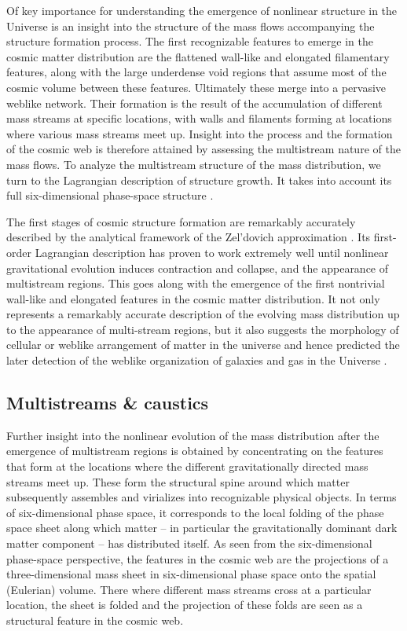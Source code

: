 \documentclass[a4paper, 11pt]{article}
\begin{document}
Of key importance for understanding the emergence of nonlinear structure in the Universe is an insight into the structure of the mass flows accompanying the structure formation process. The first recognizable features to emerge in the cosmic matter distribution are the flattened wall-like and elongated filamentary features, along with the large underdense void regions that assume most of the cosmic volume between these features. Ultimately these merge into a pervasive weblike network. Their formation is the result of the accumulation of different mass streams at specific locations, with walls and filaments forming at locations where various mass streams meet up.  Insight into the process and the formation of the cosmic web is therefore attained by assessing the multistream nature of the mass flows. To analyze the multistream structure of the mass distribution, we turn to the Lagrangian description of structure growth. It takes into
account its full six-dimensional phase-space structure \cite[see][for key contributions on this.]{Shandarin:2010,Shandarin:2011,Shandarin:2012,Abel:2012,Falck:2012}. 

The first stages of cosmic structure formation are remarkably accurately described by the analytical framework of the Zel'dovich approximation \cite{Zeldovich:1970}. Its first-order Lagrangian description has proven to work extremely well until nonlinear gravitational evolution induces contraction and collapse, and the appearance of multistream regions. This goes along with the emergence of the first nontrivial wall-like and elongated features in the cosmic matter distribution. It not only represents a remarkably accurate description of the evolving mass distribution up to the appearance of multi-stream regions, but it also suggests the morphology of cellular or weblike arrangement of matter in the universe and hence predicted the later detection of the weblike organization of galaxies and gas in the Universe \cite{ einasto1977, lapparent1986,Colless:2003,Huchra:2012, Granett:2012}. 

\subsection{Multistreams \& caustics}
Further insight into the nonlinear evolution of the mass distribution after the emergence of multistream regions is obtained by concentrating on the features that form at the locations where the different gravitationally directed mass streams meet up. These form the structural spine around which matter subsequently assembles and virializes into recognizable physical objects. In terms of six-dimensional phase space, it corresponds to the local folding of the phase space sheet along which matter -- in particular the gravitationally dominant dark matter component -- has distributed itself. As seen from the six-dimensional phase-space perspective, the features in the cosmic web are the projections of a three-dimensional mass sheet in six-dimensional phase space onto the spatial (Eulerian) volume. There where different mass streams cross at a particular location, the sheet is folded and the projection of these folds are seen as a structural feature in the cosmic web.
\end{document}
